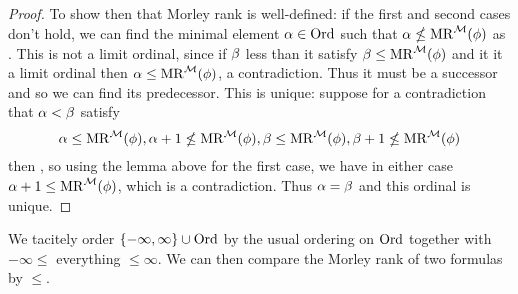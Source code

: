 \begin{proof}
    To show then that Morley rank is well-defined: 
    if the first and second cases don't hold,
    we can find the minimal element $\alpha \in \operatorname{Ord}$ such that 
    $\alpha \nleq \mathrm{MR}^{\mathcal{M}}(\phi)$
    as .
    This is not a limit ordinal, since if $\beta$ less than it satisfy
    $\beta \leq \mathrm{MR}^{\mathcal{M}}(\phi)$ and it it a limit ordinal then 
    $\alpha \leq \mathrm{MR}^{\mathcal{M}}(\phi)$, a contradiction.
    Thus it must be a successor and so we can find its predecessor.
    This is unique: suppose for a contradiction that $\alpha < \beta$ satisfy 
    \[\alpha \leq \mathrm{MR}^{\mathcal{M}}(\phi), \alpha + 1 \nleq \mathrm{MR}^{\mathcal{M}}(\phi), 
    \beta \leq \mathrm{MR}^{\mathcal{M}}(\phi), \beta + 1 \nleq \mathrm{MR}^{\mathcal{M}}(\phi)\] 
    then ,
    so using the lemma above for the first case,
    we have in either case $\alpha + 1 \leq \mathrm{MR}^{\mathcal{M}}(\phi)$,
    which is a contradiction.
    Thus $\alpha = \beta$ and this ordinal is unique.
\end{proof}
\begin{rmk}
    We tacitely order $\left\{-\infty,\infty\right\} \cup \operatorname{Ord}$ by the usual ordering on 
    $\operatorname{Ord}$ together with $-\infty \leq$ everything $\leq \infty$.
    We can then compare the Morley rank of two formulas by $\leq$.
\end{rmk}

